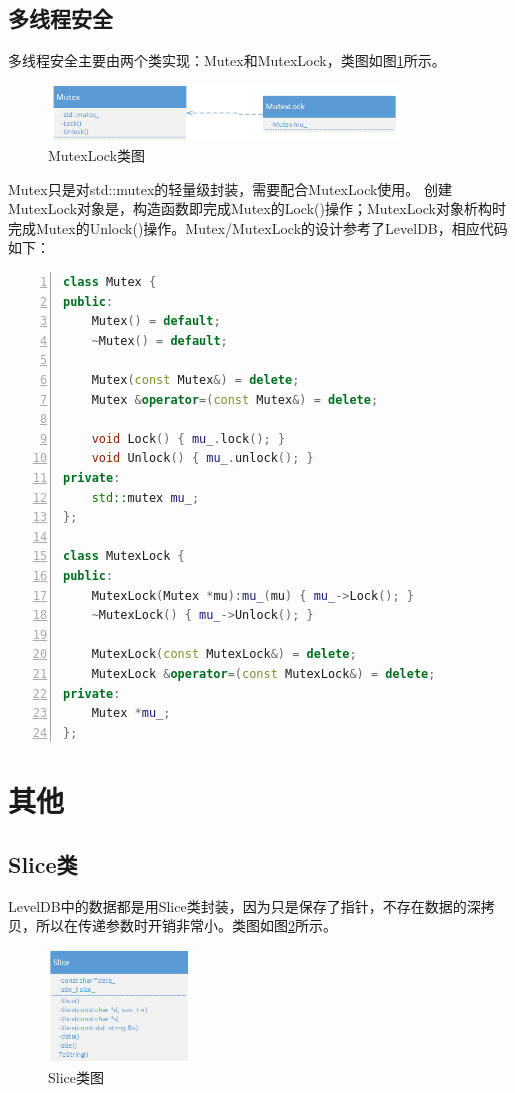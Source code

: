\documentclass[bachelor]{thesis-uestc}
\begin{document}
\subsection{多线程安全}
多线程安全主要由两个类实现：Mutex和MutexLock，类图如图\ref{fig:mutexlock}所示。

\begin{figure}[htbp]
	\centering\includegraphics[height=1.5cm]{images/mutexlock.png}
	\caption{MutexLock类图}
	\label{fig:mutexlock}
\end{figure}

Mutex只是对std::mutex的轻量级封装，需要配合MutexLock使用。 创建MutexLock对象是，构造函数即完成Mutex的Lock()操作；MutexLock对象析构时完成Mutex的Unlock()操作。Mutex/MutexLock的设计参考了LevelDB，相应代码如下：

\begin{lstlisting}[language=C++, basicstyle=\ttfamily\tiny, numbers=left, numberstyle=\tiny, keywordstyle=\color{blue!70}, commentstyle=\color{red!50!green!50!blue!50}, frame=shadowbox, rulesepcolor=\color{red!20!green!20!blue!20}]
class Mutex {
public:
	Mutex() = default;
	~Mutex() = default;
	
	Mutex(const Mutex&) = delete;
	Mutex &operator=(const Mutex&) = delete;
	
	void Lock() { mu_.lock(); }
	void Unlock() { mu_.unlock(); }
private:
	std::mutex mu_;
};

class MutexLock {
public:
	MutexLock(Mutex *mu):mu_(mu) { mu_->Lock(); }
	~MutexLock() { mu_->Unlock(); }
	
	MutexLock(const MutexLock&) = delete;
	MutexLock &operator=(const MutexLock&) = delete;
private:
	Mutex *mu_;
};
\end{lstlisting}

\section{其他}
\subsection{Slice类}
LevelDB中的数据都是用Slice类封装，因为只是保存了指针，不存在数据的深拷贝，所以在传递参数时开销非常小。类图如图\ref{fig:slice}所示。

\begin{figure}[htbp]
	\centering\includegraphics[height=3cm]{images/slice.png}
	\caption{Slice类图}
	\label{fig:slice}
\end{figure}
\end{document}

